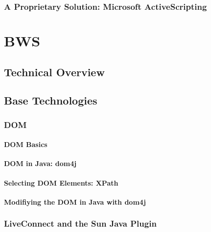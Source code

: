     
    
  \subsubsection{A Proprietary Solution: Microsoft ActiveScripting}
  \label{sec:activescripting}
  
\section{BWS}
 \subsection{Technical Overview}
 \subsection{Base Technologies}
  \subsubsection{DOM}
  
    
   
   \paragraph{DOM Basics}
   
    
    
   \paragraph{DOM in Java: dom4j}
    
    
    
   \paragraph{Selecting DOM Elements: XPath}
   
    
   
   \paragraph{Modifiying the DOM in Java with dom4j}
   
    
    
  \subsubsection{LiveConnect and the Sun Java Plugin}
